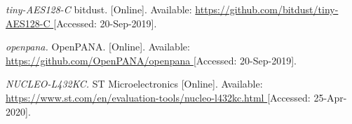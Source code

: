 \begin{thebibliography}{9}
\textit{
tiny-AES128-C
}
bitdust.
[Online]. Available:
\url{
https://github.com/bitdust/tiny-AES128-C
}
[Accessed: 20-Sep-2019].

\textit{
openpana.
}
OpenPANA.
[Online]. Available:
\url{
https://github.com/OpenPANA/openpana
}
[Accessed: 20-Sep-2019].

\textit{
NUCLEO-L432KC.
}
ST Microelectronics
[Online]. Available:
\url{
https://www.st.com/en/evaluation-tools/nucleo-l432kc.html
}
[Accessed: 25-Apr-2020].






















































\end{thebibliography}
